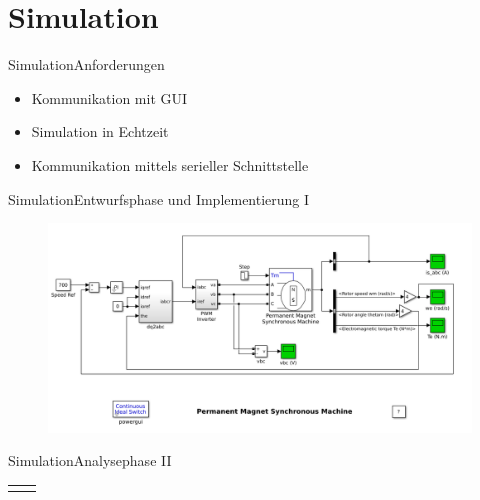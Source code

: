\section{Simulation}
	
	\begin{frame}{Simulation}{Anforderungen}
	  \begin{itemize}
	    \item Kommunikation mit GUI
	    \item Simulation in Echtzeit
	    \item Kommunikation mittels serieller Schnittstelle
	  \end{itemize}
	\end{frame}

	\begin{frame}{Simulation}{Entwurfsphase und Implementierung I}
	  	\begin{figure}[htbp]
	  		\centering
	  		\includegraphics[width=\textwidth]{../sim/pictures/powerPmmotor.png}
	  	\end{figure}
	\end{frame}

	\begin{frame}{Simulation}{Analysephase II}
		\begin{center}
		\begin{tabular}{cc}
			\begin{minipage}{0.4\textwidth} 
				
			\end{minipage}	
			&  
			\begin{minipage}{0.4\textwidth}
				\vspace{-0.35cm}
					
			\end{minipage}	
			\\ 
		\end{tabular} 
	
		\vspace{0.5cm}
		
	\end{center}
	\end{frame}

